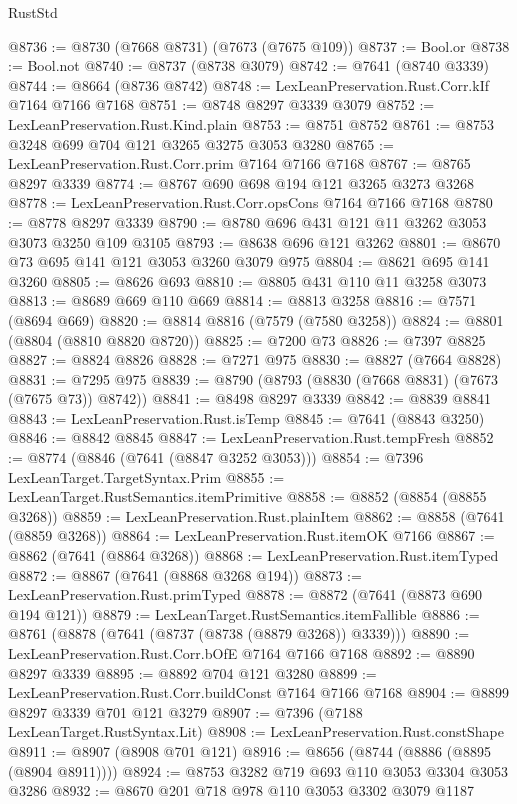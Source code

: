 \begin{lexlean}{RustStd}
\begin{coremodule}
{\begin{coremodule}
{{{{{{{{{{{{{{{{{{{{{{{{{{{{{{{{@8736 := @8730 (@7668 @8731) (@7673 (@7675 @109))
@8737 := Bool.or
@8738 := Bool.not
@8740 := @8737 (@8738 @3079)
@8742 := @7641 (@8740 @3339)
@8744 := @8664 (@8736 @8742)
@8748 := LexLeanPreservation.Rust.Corr.kIf @7164 @7166 @7168
@8751 := @8748 @8297 @3339 @3079
@8752 := LexLeanPreservation.Rust.Kind.plain
@8753 := @8751 @8752
@8761 := @8753 @3248 @699 @704 @121 @3265 @3275 @3053 @3280
@8765 := LexLeanPreservation.Rust.Corr.prim @7164 @7166 @7168
@8767 := @8765 @8297 @3339
@8774 := @8767 @690 @698 @194 @121 @3265 @3273 @3268
@8778 := LexLeanPreservation.Rust.Corr.opsCons @7164 @7166 @7168
@8780 := @8778 @8297 @3339
@8790 := @8780 @696 @431 @121 @11 @3262 @3053 @3073 @3250 @109 @3105
@8793 := @8638 @696 @121 @3262
@8801 := @8670 @73 @695 @141 @121 @3053 @3260 @3079 @975
@8804 := @8621 @695 @141 @3260
@8805 := @8626 @693
@8810 := @8805 @431 @110 @11 @3258 @3073
@8813 := @8689 @669 @110 @669
@8814 := @8813 @3258
@8816 := @7571 (@8694 @669)
@8820 := @8814 @8816 (@7579 (@7580 @3258))
@8824 := @8801 (@8804 (@8810 @8820 @8720))
@8825 := @7200 @73
@8826 := @7397 @8825
@8827 := @8824 @8826
@8828 := @7271 @975
@8830 := @8827 (@7664 @8828)
@8831 := @7295 @975
@8839 := @8790 (@8793 (@8830 (@7668 @8831) (@7673 (@7675 @73)) @8742))
@8841 := @8498 @8297 @3339
@8842 := @8839 @8841
@8843 := LexLeanPreservation.Rust.isTemp
@8845 := @7641 (@8843 @3250)
@8846 := @8842 @8845
@8847 := LexLeanPreservation.Rust.tempFresh
@8852 := @8774 (@8846 (@7641 (@8847 @3252 @3053)))
@8854 := @7396 LexLeanTarget.TargetSyntax.Prim
@8855 := LexLeanTarget.RustSemantics.itemPrimitive
@8858 := @8852 (@8854 (@8855 @3268))
@8859 := LexLeanPreservation.Rust.plainItem
@8862 := @8858 (@7641 (@8859 @3268))
@8864 := LexLeanPreservation.Rust.itemOK @7166
@8867 := @8862 (@7641 (@8864 @3268))
@8868 := LexLeanPreservation.Rust.itemTyped
@8872 := @8867 (@7641 (@8868 @3268 @194))
@8873 := LexLeanPreservation.Rust.primTyped
@8878 := @8872 (@7641 (@8873 @690 @194 @121))
@8879 := LexLeanTarget.RustSemantics.itemFallible
@8886 := @8761 (@8878 (@7641 (@8737 (@8738 (@8879 @3268)) @3339)))
@8890 := LexLeanPreservation.Rust.Corr.bOfE @7164 @7166 @7168
@8892 := @8890 @8297 @3339
@8895 := @8892 @704 @121 @3280
@8899 := LexLeanPreservation.Rust.Corr.buildConst @7164 @7166 @7168
@8904 := @8899 @8297 @3339 @701 @121 @3279
@8907 := @7396 (@7188 LexLeanTarget.RustSyntax.Lit)
@8908 := LexLeanPreservation.Rust.constShape
@8911 := @8907 (@8908 @701 @121)
@8916 := @8656 (@8744 (@8886 (@8895 (@8904 @8911))))
@8924 := @8753 @3282 @719 @693 @110 @3053 @3304 @3053 @3286
@8932 := @8670 @201 @718 @978 @110 @3053 @3302 @3079 @1187
}}}}}}}}}}}}}}}}}}}}}}}}}}}}}}}}
\end{coremodule}}
\end{coremodule}
\end{lexlean}
